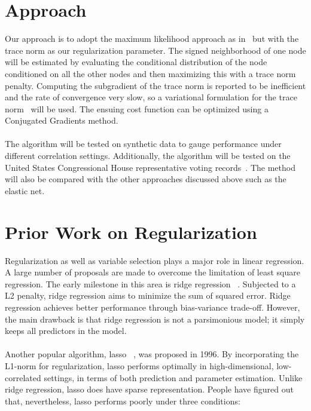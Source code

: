\documentclass[11pt]{article}
\begin{document}
\section{Approach}
Our approach is to adopt the maximum likelihood approach as in~\cite{ravikumar2010high} but with the trace norm as our regularization parameter. The signed neighborhood of one node will be estimated by evaluating the conditional distribution of the node conditioned on all the other nodes and then maximizing this with a trace norm penalty. Computing the subgradient of the trace norm is reported to be inefficient and the rate of convergence very slow, so a variational formulation for the trace norm~\cite{grave2011trace} will be used. The ensuing cost function can be optimized using a Conjugated Gradients method. \\ \\ 
The algorithm will be tested on synthetic data to gauge performance under different correlation settings. Additionally, the algorithm will be tested on the United States Congressional House representative voting records~\cite{schlimmer1987concept}. The method will also be compared with the other approaches discussed above such as the elastic net. 

\section{Prior Work on Regularization}

Regularization as well as variable selection plays a major role in linear regression. A large number of proposals are made to overcome the limitation of least square regression. The early milestone in this area is ridge regression ~\cite{AEHoerl1970ridge}. Subjected to a L2 penalty, ridge regression aims to minimize the sum of squared error. Ridge regression achieves better performance through bias-variance trade-off. However, the main drawback is that ridge regression is not a parsimonious model; it simply keeps all predictors in the model. 
\\ \\
Another popular algorithm, lasso ~\cite{tibshirani1996regression}, was proposed in 1996. By incorporating the L1-norm for regularization, lasso performs optimally in high-dimensional, low-correlated settings, in terms of both prediction and parameter estimation. Unlike ridge regression, lasso does have sparse representation. People have figured out that, nevertheless, lasso performs poorly under three conditions:
\end{document}
